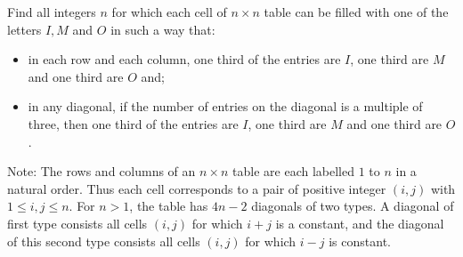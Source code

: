 Find all integers 
$n$
 for which each cell of 
$n \times n$
 table can be filled with one of the letters 
$I,M$
 and 
$O$
 in such a way that:

\begin{itemize}
    \item in each row and each column, one third of the entries are 
    $I$, 
     one third are 
    $M$
     and one third are 
    $O$ and;
    
    \item in any diagonal, if the number of entries on the diagonal is a multiple of three, then one third of the entries are 
    $I$, 
     one third are 
    $M$
     and one third are 
    $O$. 
\end{itemize}

Note:
 The rows and columns of an 
$n \times n$
 table are each labelled 
$1$
 to 
$n$
 in a natural order. Thus each cell corresponds to a pair of positive integer 
$(i,j)$
 with 
$1 \le i,j \le n$. 
 For 
$n>1$, 
 the table has 
$4n-2$
 diagonals of two types. A diagonal of first type consists all cells 
$(i,j)$
  for which 
$i+j$
 is a constant, and the diagonal of this second type consists all cells 
$(i,j)$
 for which 
$i-j$
 is constant.
